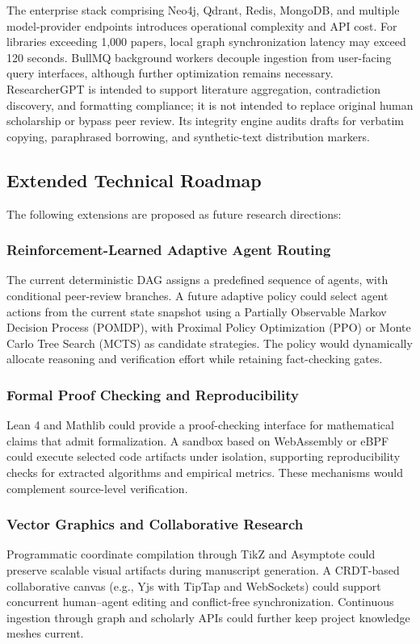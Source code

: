 \documentclass[conference]{IEEEtran}
\begin{document}
The enterprise stack comprising Neo4j, Qdrant, Redis, MongoDB, and multiple model-provider endpoints introduces operational complexity and API cost. For libraries exceeding 1,000 papers, local graph synchronization latency may exceed 120 seconds. BullMQ background workers decouple ingestion from user-facing query interfaces, although further optimization remains necessary. ResearcherGPT is intended to support literature aggregation, contradiction discovery, and formatting compliance; it is not intended to replace original human scholarship or bypass peer review. Its integrity engine audits drafts for verbatim copying, paraphrased borrowing, and synthetic-text distribution markers.

\subsection{Extended Technical Roadmap}
The following extensions are proposed as future research directions:
\subsubsection{Reinforcement-Learned Adaptive Agent Routing}
The current deterministic DAG assigns a predefined sequence of agents, with conditional peer-review branches. A future adaptive policy could select agent actions from the current state snapshot using a Partially Observable Markov Decision Process (POMDP), with Proximal Policy Optimization (PPO) or Monte Carlo Tree Search (MCTS) as candidate strategies. The policy would dynamically allocate reasoning and verification effort while retaining fact-checking gates.

\subsubsection{Formal Proof Checking and Reproducibility}
Lean 4 and Mathlib could provide a proof-checking interface for mathematical claims that admit formalization. A sandbox based on WebAssembly or eBPF could execute selected code artifacts under isolation, supporting reproducibility checks for extracted algorithms and empirical metrics. These mechanisms would complement source-level verification.

\subsubsection{Vector Graphics and Collaborative Research}
Programmatic coordinate compilation through TikZ and Asymptote could preserve scalable visual artifacts during manuscript generation. A CRDT-based collaborative canvas (e.g., Yjs with TipTap and WebSockets) could support concurrent human--agent editing and conflict-free synchronization. Continuous ingestion through graph and scholarly APIs could further keep project knowledge meshes current.
\end{document}
